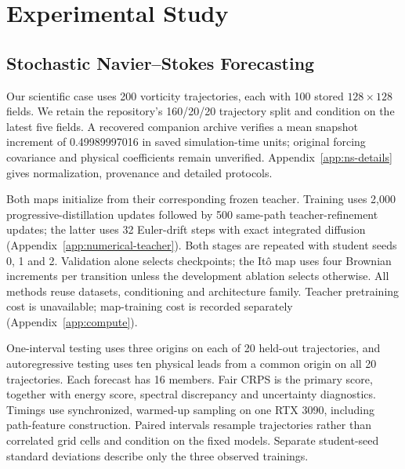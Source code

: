 \section{Experimental Study}
\subsection{Stochastic Navier--Stokes Forecasting}
Our scientific case uses 200 vorticity trajectories, each with 100 stored $128\times128$ fields. We retain the repository's 160/20/20 trajectory split and condition on the latest five fields. A recovered companion archive verifies a mean snapshot increment of 0.49989997016 in saved simulation-time units; original forcing covariance and physical coefficients remain unverified. Appendix~\ref{app:ns-details} gives normalization, provenance and detailed protocols.

Both maps initialize from their corresponding frozen teacher. Training uses 2,000 progressive-distillation updates followed by 500 same-path teacher-refinement updates; the latter uses 32 Euler-drift steps with exact integrated diffusion (Appendix~\ref{app:numerical-teacher}). Both stages are repeated with student seeds 0, 1 and 2. Validation alone selects checkpoints; the It\^o map uses four Brownian increments per transition unless the development ablation selects otherwise. All methods reuse datasets, conditioning and architecture family. Teacher pretraining cost is unavailable; map-training cost is recorded separately (Appendix~\ref{app:compute}).

One-interval testing uses three origins on each of 20 held-out trajectories, and autoregressive testing uses ten physical leads from a common origin on all 20 trajectories. Each forecast has 16 members. Fair CRPS is the primary score, together with energy score, spectral discrepancy and uncertainty diagnostics. Timings use synchronized, warmed-up sampling on one RTX 3090, including path-feature construction. Paired intervals resample trajectories rather than correlated grid cells and condition on the fixed models. Separate student-seed standard deviations describe only the three observed trainings.

\begin{table}[t]
\caption{Navier--Stokes comparison at one forecast interval and at physical lead ten: mean over three student-training seeds $\pm$ sample standard deviation. Paired trajectory-bootstrap intervals and individual students are in Appendix~\ref{app:replications}.}
\label{tab:replication}
\centering
{}
\end{table}

